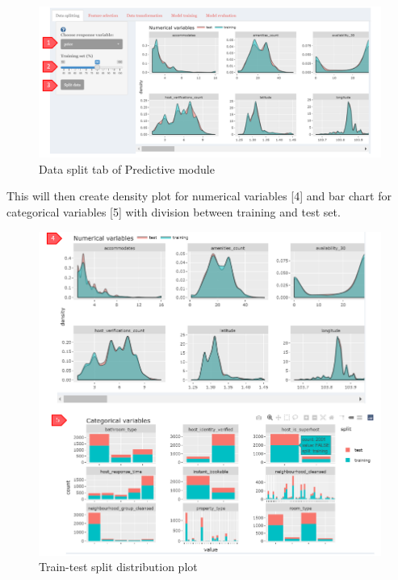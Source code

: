\documentclass[
  12pt,
]{article}
\begin{document}
\begin{figure}[H]

{\centering \includegraphics[width=0.95\linewidth]{images/datasplit1} 

}

\caption{Data split tab of Predictive module}\label{fig:unnamed-chunk-18}
\end{figure}

This will then create density plot for numerical variables {[}4{]} and
bar chart for categorical variables {[}5{]} with division between
training and test set.

\begin{figure}[H]

{\centering \includegraphics[width=0.95\linewidth]{images/datasplit2} 

}

\caption{Train-test split distribution plot}\label{fig:unnamed-chunk-19}
\end{figure}
\end{document}
